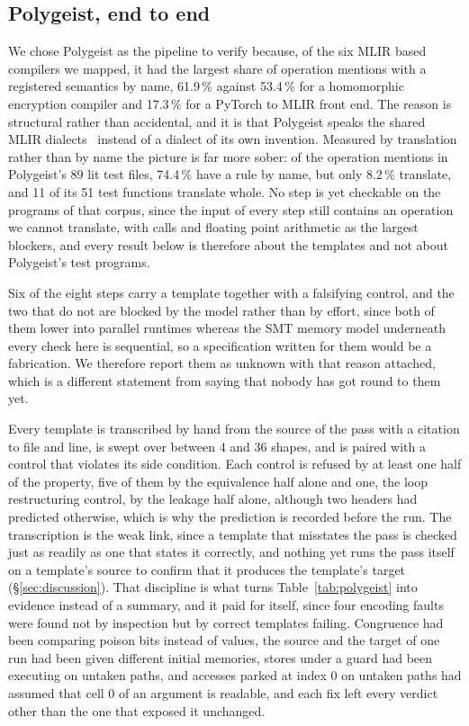 \subsection{Polygeist, end to end}
\label{sec:verify:polygeist}
We chose Polygeist as the pipeline to verify because, of the six MLIR based compilers we mapped, it had the largest share of operation mentions with a registered semantics by name, 61.9\,\% against 53.4\,\% for a homomorphic encryption compiler and 17.3\,\% for a PyTorch to MLIR front end.
The reason is structural rather than accidental, and it is that Polygeist speaks the shared MLIR dialects~\cite{lattner2021mlir} instead of a dialect of its own invention.
Measured by translation rather than by name the picture is far more sober: of the operation mentions in Polygeist's 89 lit test files, 74.4\,\% have a rule by name, but only 8.2\,\% translate, and 11 of its 51 test functions translate whole.
No step is yet checkable on the programs of that corpus, since the input of every step still contains an operation we cannot translate, with calls and floating point arithmetic as the largest blockers, and every result below is therefore about the templates and not about Polygeist's test programs.

Six of the eight steps carry a template together with a falsifying control, and the two that do not are blocked by the model rather than by effort, since both of them lower into parallel runtimes whereas the SMT memory model underneath every check here is sequential, so a specification written for them would be a fabrication.
We therefore report them as unknown with that reason attached, which is a different statement from saying that nobody has got round to them yet.

Every template is transcribed by hand from the source of the pass with a citation to file and line, is swept over between 4 and 36 shapes, and is paired with a control that violates its side condition.
Each control is refused by at least one half of the property, five of them by the equivalence half alone and one, the loop restructuring control, by the leakage half alone, although two headers had predicted otherwise, which is why the prediction is recorded before the run.
The transcription is the weak link, since a template that misstates the pass is checked just as readily as one that states it correctly, and nothing yet runs the pass itself on a template's source to confirm that it produces the template's target (\S\ref{sec:discussion}).
That discipline is what turns Table~\ref{tab:polygeist} into evidence instead of a summary, and it paid for itself, since four encoding faults were found not by inspection but by correct templates failing.
Congruence had been comparing poison bits instead of values, the source and the target of one run had been given different initial memories, stores under a guard had been executing on untaken paths, and accesses parked at index 0 on untaken paths had assumed that cell 0 of an argument is readable, and each fix left every verdict other than the one that exposed it unchanged.

